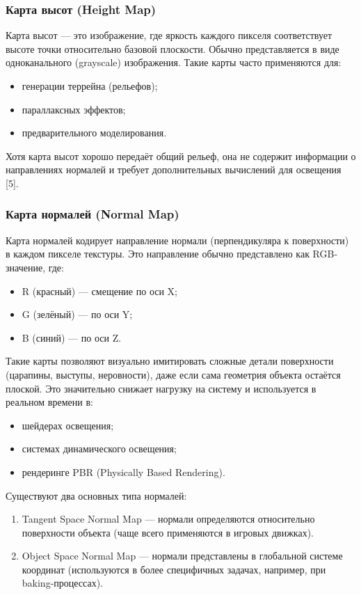 \subsubsection{Карта высот (Height Map)}

Карта высот — это изображение, где яркость каждого пикселя соответствует высоте точки относительно базовой плоскости. Обычно представляется в виде одноканального (grayscale) изображения. Такие карты часто применяются для:
\begin{itemize}
	\item генерации террейна (рельефов);
	\item параллаксных эффектов;
	\item предварительного моделирования.
\end{itemize}

Хотя карта высот хорошо передаёт общий рельеф, она не содержит информации о направлениях нормалей и требует дополнительных вычислений для освещения [5].
\subsubsection{Карта нормалей (Normal Map)}

Карта нормалей кодирует направление нормали (перпендикуляра к поверхности) в каждом пикселе текстуры. Это направление обычно представлено как RGB-значение, где:
\begin{itemize}
	\item R (красный) — смещение по оси X;
	\item G (зелёный) — по оси Y;
	\item B (синий) — по оси Z.
\end{itemize}

Такие карты позволяют визуально имитировать сложные детали поверхности (царапины, выступы, неровности), даже если сама геометрия объекта остаётся плоской. Это значительно снижает нагрузку на систему и используется в реальном времени в:
\begin{itemize}
	\item шейдерах освещения;
	\item системах динамического освещения;
	\item рендеринге PBR (Physically Based Rendering).
\end{itemize}

Существуют два основных типа нормалей:
\begin{enumerate}
	\item Tangent Space Normal Map — нормали определяются относительно поверхности объекта (чаще всего применяются в игровых движках).
	\item Object Space Normal Map — нормали представлены в глобальной системе координат (используются в более специфичных задачах, например, при baking-процессах).
\end{enumerate}
